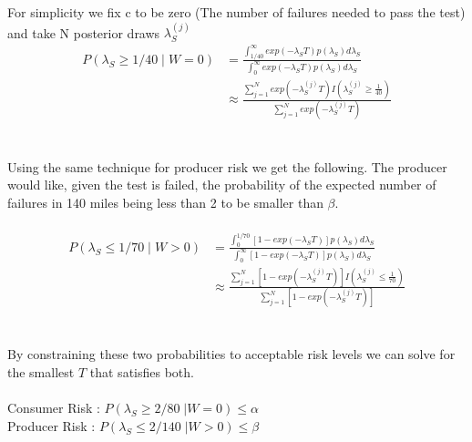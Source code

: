 \documentclass[12pt]{article}
\begin{document}
For simplicity we fix c to be zero (The number of failures needed to pass the
test) and take N posterior draws $ \lambda_S^{(j)} $
$$
\begin{aligned}
	 P(\lambda_S \geq 1/40 \; \vert \; W = 0) &= \frac{\int_{1/40}^{\infty} exp(-\lambda_S T)p(\lambda_S)d\lambda_S} {\int_{0}^{\infty} exp(-\lambda_S T)p(\lambda_S)d\lambda_S} \\
     &\approx \frac{\sum_{j = 1}^{N} exp(-\lambda_S^{(j)} T)I(\lambda_S^{(j)} \geq \frac{1}{40})} {\sum_{j = 1}^{N} exp(-\lambda_S^{(j)} T)}
\end{aligned}
$$
\\
\\
Using the same technique for producer risk we get the following. The producer
would like, given the test is failed, the probability of the expected number of
failures in 140 miles being less than 2 to be smaller than $\beta$.
\\
\\
$$
\begin{aligned}
	 P(\lambda_S \leq 1/70 \; \vert \; W > 0) &= \frac{\int_{0}^{1/70} [1 - exp(-\lambda_S T)]p(\lambda_S)d\lambda_S} {\int_{0}^{\infty} [1 - exp(-\lambda_S T)]p(\lambda_S)d\lambda_S} \\
     &\approx  \frac{\sum_{j = 1}^{N} [1 - exp(-\lambda_S^{(j)} T)] I(\lambda_S^{(j)} \leq \frac{1}{70})} {\sum_{j = 1}^{N} [1 - exp(-\lambda_S^{(j)} T)]}
\end{aligned}
$$
\\
\\
By constraining these two probabilities to acceptable risk levels we can solve
for the smallest $ T $ that satisfies both.
\\
\\
Consumer Risk : $ P(\lambda_S \geq 2/80 \; \vert  W = 0) \leq \alpha $ \\
Producer Risk : $ P(\lambda_S \leq 2/140 \; \vert  W > 0) \leq \beta $
\end{document}
